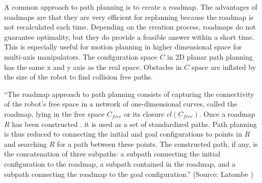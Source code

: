 A common approach to path planning is to create a roadmap. The advantages of roadmaps are that they are very efficient for replanning because the roadmap is not recalculated each time. Depending on the creation process, roadmaps do not guarantee optimality, but they do provide a feasible answer within a short time. This is especially useful for motion planning in higher dimensional space for multi-axis manipulators. The configuration space \(C\) in 2D planar path planning has the same x and y axis as the real space. Obstacles in \(C\) space are inflated by the size of the robot to find collision free paths.

\begin{displayquote}
    \enquote{The roadmap approach to path planning consists of capturing the connectivity of the robot's free space in a network of one-dimensional curves, called the roadmap, lying in the free space \(C_{free}\) or its closure \(cl(C_{free})\). Once a roadmap \(R\) has been constructed . it is used as a set of standardized paths. Path planning is thus reduced to connecting the initial and goal configurations to points in \(R\) and searching \(R\) for a path between these points. The constructed path, if any, is the concatenation of three subpaths: a subpath connecting the initial configuration to the roadmap, a subpath contained in the roadmap, and a subpath connecting the roadmap to the goal configuration.} (Source: Latombe \cite{latombe_robot_2003})
\end{displayquote}

